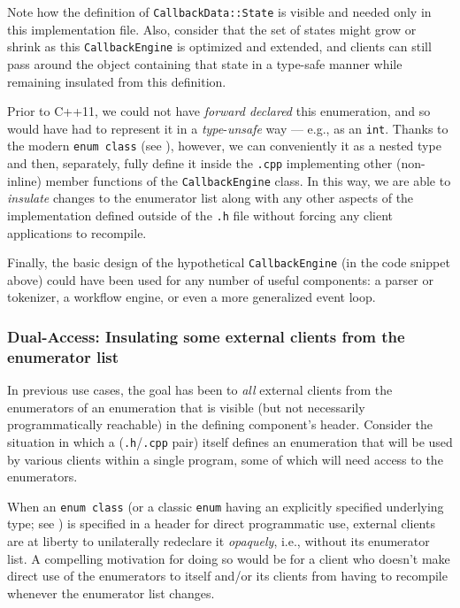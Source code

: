 \noindent Note how the definition of \lstinline!CallbackData::State! is visible and
needed only in this implementation file. Also, consider that the set of
states might grow or shrink as this \lstinline!CallbackEngine! is optimized
and extended, and clients can still pass around the object containing
that state in a type-safe manner while remaining insulated from this
definition.

Prior to C++11, we could not have \emph{forward declared} this
enumeration, and so would have had to represent it in a
\emph{type}-\emph{unsafe} way --- e.g., as an \lstinline!int!. Thanks to
the modern \lstinline!enum!~\lstinline!class! (see ), however, we can
conveniently  it as a nested type and then,
separately, fully define it inside the \lstinline!.cpp! implementing other
(non-inline) member functions of the \lstinline!CallbackEngine! class. In
this way, we are able to \emph{insulate} changes to the enumerator list
along with any other aspects of the implementation defined outside of
the \lstinline!.h! file without forcing any client applications to
recompile.

Finally, the basic design of the hypothetical \lstinline!CallbackEngine!
(in the code snippet above) could have been used for any number of
useful components: a parser or tokenizer, a workflow engine, or even a
more generalized event loop.

\subsubsection[Dual-Access: Insulating some external clients from the enumerator list]{Dual-Access: Insulating some external clients from the enumerator list}\label{dual-access:-insulating-some-external-clients-from-the-enumerator-list}

In previous use cases, the goal has been to  \emph{all}
external clients from the enumerators of an enumeration that is visible
(but not necessarily programmatically reachable) in the defining
component's header. Consider the situation in which a 
(\lstinline!.h!/\lstinline!.cpp! pair) itself defines an enumeration that will
be used by various clients within a single program, some of which will
need access to the enumerators.

When an \lstinline!enum!~\lstinline!class! (or a classic \lstinline!enum! having
an explicitly specified underlying type; see ) is specified in
a header for direct programmatic use, external clients are at liberty to
unilaterally redeclare it \emph{opaquely}, i.e., without its enumerator
list. A compelling motivation for doing so would be for a client who
doesn't make direct use of the enumerators to  itself
and/or its clients from having to recompile whenever the enumerator list
changes.

